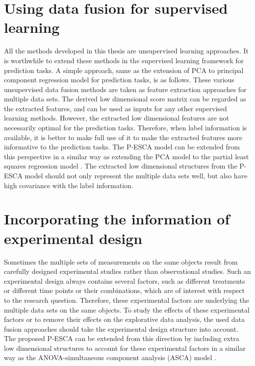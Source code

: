\section{Using data fusion for supervised learning}
All the methods developed in this thesis are unsupervised learning approaches. It is worthwhile to extend these methods in the supervised learning framework for prediction tasks. A simple approach, same as the extension of PCA to principal component regression model for prediction tasks, is as follows. These various unsupervised data fusion methods are taken as feature extraction approaches for multiple data sets. The derived low dimensional score matrix can be regarded as the extracted features, and can be used as inputs for any other supervised learning methods. However, the extracted low dimensional features are not necessarily optimal for the prediction tasks. Therefore, when label information is available, it is better to make full use of it to make the extracted features more informative to the prediction tasks. The P-ESCA model can be extended from this perspective in a similar way as extending the PCA model to the partial least squares regression model \cite{geladi1986partial}. The extracted low dimensional structures from the P-ESCA model should not only represent the multiple data sets well, but also have high covariance with the label information.

\section{Incorporating the information of experimental design}
Sometimes the multiple sets of measurements on the same objects result from carefully designed experimental studies rather than observational studies. Such an experimental design always contains several factors, such as different treatments or different time points or their combinations, which are of interest with respect to the research question. Therefore, these experimental factors are underlying the multiple data sets on the same objects. To study the effects of these experimental factors or to remove their effects on the explorative data analysis, the used data fusion approaches should take the experimental design structure into account. The proposed P-ESCA can be extended from this direction by including extra low dimensional structures to account for these experimental factors in a similar way as the ANOVA-simultaneous component analysis (ASCA) model \cite{smilde2005anova}.




























